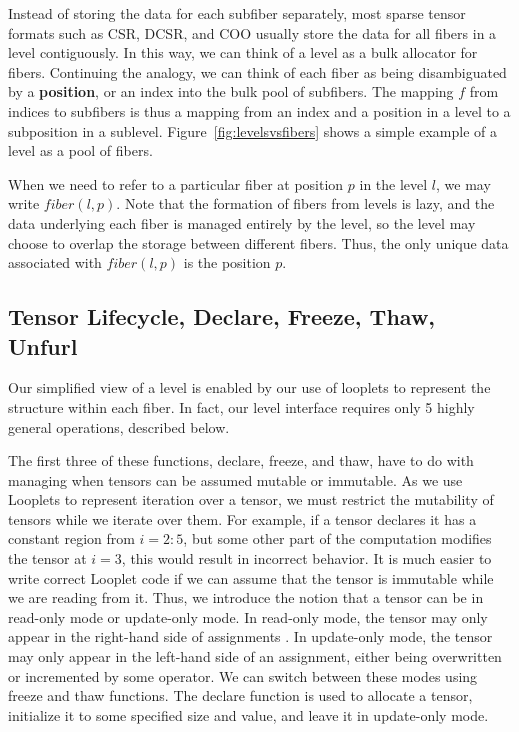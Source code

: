 Instead of storing the data for each subfiber separately, most sparse tensor
formats such as CSR, DCSR, and COO usually store the data for all fibers in a
level contiguously. In this way, we can think of a level as a bulk allocator for
fibers. Continuing the analogy, we can think of each fiber as being
disambiguated by a \textbf{position}, or an index into the bulk pool of
subfibers. The mapping $f$ from indices to subfibers is thus a mapping from an
index and a position in a level to a subposition in a sublevel.
Figure~\ref{fig:levelsvsfibers} shows a simple example of a level as a pool of fibers.

When we need to refer to a particular fiber at position $p$ in the level $l$, we
may write $fiber(l, p)$. Note that the formation of fibers from levels is lazy,
and the data underlying each fiber is managed entirely by the level, so the
level may choose to overlap the storage between different fibers. Thus, the only
unique data associated with $fiber(l, p)$ is the position $p$.



\subsection{Tensor Lifecycle, Declare, Freeze, Thaw, Unfurl}

Our simplified view of a level is enabled by our use of looplets to represent
the structure within each fiber.
%
In fact, our level interface requires only 5
highly general operations, described below.

The first three of these functions, declare, freeze, and thaw, have to do with
managing when tensors can be assumed mutable or immutable.
%
%
As we use Looplets to
represent iteration over a tensor, we must restrict the mutability of tensors
while we iterate over them. 
%
For example, if a tensor declares it has a constant
region from $i = 2:5$, but some other part of the computation modifies the
tensor at $i = 3$, this would result in incorrect behavior.
%
It is much easier to
write correct Looplet code if we can assume that the tensor is immutable while
we are reading from it.
%
Thus, we introduce the notion that a tensor can be in
read-only mode or update-only mode.  
%
In read-only mode, the tensor may only
appear in the right-hand side of assignments
%
. In update-only mode, the tensor
may only appear in the left-hand side of an assignment, either being overwritten
or incremented by some operator. 
%
We can switch between these modes using freeze
and thaw functions.
%
The declare function is used to allocate a tensor,
initialize it to some specified size and value, and leave it in update-only
mode. 

